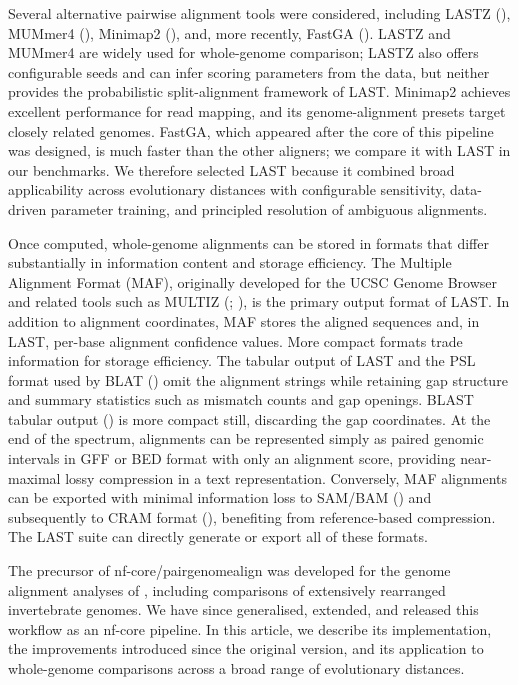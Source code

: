 \documentclass[PCJ,Unicode,screen]{cedram}
\begin{document}
Several alternative pairwise alignment tools were considered, including LASTZ (\cite{Harris_2007}), MUMmer4 (\cite{Marcais_2018}), Minimap2 (\cite{Li_2018}), and, more recently, FastGA (\cite{Myers_2025}). LASTZ and MUMmer4 are widely used for whole-genome comparison; LASTZ also offers configurable seeds and can infer scoring parameters from the data, but neither provides the probabilistic split-alignment framework of LAST. Minimap2 achieves excellent performance for read mapping, and its genome-alignment presets target closely related genomes. FastGA, which appeared after the core of this pipeline was designed, is much faster than the other aligners; we compare it with LAST in our benchmarks. We therefore selected LAST because it combined broad applicability across evolutionary distances with configurable sensitivity, data-driven parameter training, and principled resolution of ambiguous alignments.

Once computed, whole-genome alignments can be stored in formats that differ substantially in information content and storage efficiency. The Multiple Alignment Format (MAF), originally developed for the UCSC Genome Browser and related tools such as MULTIZ (\cite{Kent_2002a}; \cite{Blanchette_2004}), is the primary output format of LAST. In addition to alignment coordinates, MAF stores the aligned sequences and, in LAST, per-base alignment confidence values. More compact formats trade information for storage efficiency. The tabular output of LAST and the PSL format used by BLAT (\cite{Kent_2002b}) omit the alignment strings while retaining gap structure and summary statistics such as mismatch counts and gap openings. BLAST tabular output (\cite{Altschul_1990}) is more compact still, discarding the gap coordinates. At the end of the spectrum, alignments can be represented simply as paired genomic intervals in GFF or BED format with only an alignment score, providing near-maximal lossy compression in a text representation. Conversely, MAF alignments can be exported with minimal information loss to SAM/BAM (\cite{Li_2009}) and subsequently to CRAM format (\cite{Bonfield_2022}), benefiting from reference-based compression. The LAST suite can directly generate or export all of these formats.

The precursor of nf-core/pairgenomealign was developed for the genome alignment analyses of \citet{Plessy_2024}, including comparisons of extensively rearranged invertebrate genomes. We have since generalised, extended, and released this workflow as an nf-core pipeline. In this article, we describe its implementation, the improvements introduced since the original version, and its application to whole-genome comparisons across a broad range of evolutionary distances.
\end{document}
